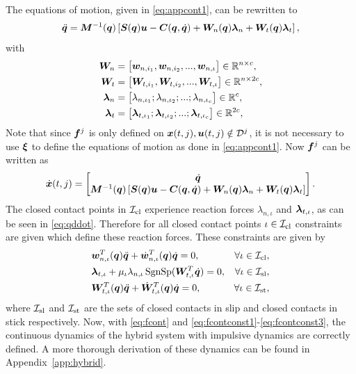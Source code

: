 \documentclass[../DC2017114Bouma.tex]{subfiles}
\begin{document}
The equations of motion, given in \eqref{eq:appcont1}, can be rewritten to
\begin{align}
\ddot{{\boldsymbol{q}}} = {\boldsymbol{M}}^{-1}({\boldsymbol{q}})\left[ {\boldsymbol{S}}({\boldsymbol{q}}){\boldsymbol{u}} - {\boldsymbol{C}}({\boldsymbol{q}},\dot{{\boldsymbol{q}}}) + {\boldsymbol{W}}_{n}({\boldsymbol{q}})\boldsymbol{\lambda}_{n} + {\boldsymbol{W}}_{t}({\boldsymbol{q}})\boldsymbol{\lambda}_{t}\right],\label{eq:qddot}
\end{align}
with
\begin{align}
{\boldsymbol{W}}_n &= \begin{bmatrix}
{\boldsymbol{w}}_{n,i_1},{\boldsymbol{w}}_{n,i_2},...,{\boldsymbol{w}}_{n,\iota}
\end{bmatrix}\in\mathbb{R}^{n\times c},\\
{\boldsymbol{W}}_t &= \begin{bmatrix}
{\boldsymbol{W}}_{t,i_1},{\boldsymbol{W}}_{t,i_2},...,{\boldsymbol{W}}_{t,\iota} 
\end{bmatrix}\in\mathbb{R}^{n\times 2c},\\
\boldsymbol{\lambda}_n &= \begin{bmatrix}
\lambda_{n,\iota_1};\lambda_{n,\iota_2};...;\lambda_{n,\iota_c} 
\end{bmatrix}\in\mathbb{R}^{c},\\
\boldsymbol{\lambda}_t &= \begin{bmatrix}
\boldsymbol{\lambda}_{t,\iota_1};\boldsymbol{\lambda}_{t,\iota_2};...;\boldsymbol{\lambda}_{t,\iota_c} 
\end{bmatrix}\in\mathbb{R}^{2c},
\end{align}
Note that since ${\boldsymbol{f}}^j$ is only defined on ${\boldsymbol{x}}(t,j),{\boldsymbol{u}}(t,j)\notin \mathcal{D}^j$, it is not necessary to use $\boldsymbol{\xi}$ to define the equations of motion as done in \eqref{eq:appcont1}. Now ${\boldsymbol{f}}^j$ can be written as
\begin{align}
\dot{{\boldsymbol{x}}}(t,j) =\begin{bmatrix}
\dot{{\boldsymbol{q}}}\\ {\boldsymbol{M}}^{-1}({\boldsymbol{q}})\left[ {\boldsymbol{S}}({\boldsymbol{q}}){\boldsymbol{u}} - {\boldsymbol{C}}({\boldsymbol{q}},\dot{{\boldsymbol{q}}}) + {\boldsymbol{W}}_{n}({\boldsymbol{q}})\boldsymbol{\lambda}_{n} + {\boldsymbol{W}}_{t}({\boldsymbol{q}})\boldsymbol{\lambda}_{t}\right]
\end{bmatrix}.\label{eq:fcont}
\end{align}
The closed contact points in $\mathcal{I}_{\text{cl}}$ experience reaction forces $\lambda_{n,\iota}$ and $\boldsymbol{\lambda}_{t,\iota}$, as can be seen in \eqref{eq:qddot}. Therefore for all closed contact points $\iota\in\mathcal{I}_{\text{cl}}$ constraints are given which define these reaction forces. These constraints are given by
\begin{align}
&{\boldsymbol{w}}^T_{n,\iota}({\boldsymbol{q}})\ddot{{\boldsymbol{q}}} + \dot{{\boldsymbol{w}}}^T_{n,\iota}({\boldsymbol{q}})\dot{{\boldsymbol{q}}} = 0, &\forall \iota\in\mathcal{I}_{\text{cl}},\label{eq:fcontconst1}\\
&\boldsymbol{\lambda}_{t,\iota} + \mu_{\iota}\lambda_{n,\iota}\operatorname{\text{SgnSp}}({\boldsymbol{W}}_{t,\iota}^T\dot{{\boldsymbol{q}}}) = 0, &\forall \iota\in\mathcal{I}_{\text{sl}},\label{eq:fcontconst2}\\
&{\boldsymbol{W}}^T_{t,\iota}({\boldsymbol{q}})\ddot{{\boldsymbol{q}}} + \dot{{\boldsymbol{W}}}^T_{t,\iota}({\boldsymbol{q}})\dot{{\boldsymbol{q}}} = 0, &\forall \iota\in\mathcal{I}_{\text{st}},\label{eq:fcontconst3}
\end{align}
where $\mathcal{I}_{\text{sl}}$ and $\mathcal{I}_{\text{st}}$ are the sets of closed contacts in slip and closed contacts in stick respectively. Now, with \eqref{eq:fcont} and \eqref{eq:fcontconst1}-\eqref{eq:fcontconst3}, the continuous dynamics of the hybrid system with impulsive dynamics are correctly defined. A more thorough derivation of these dynamics can be found in Appendix~\ref{app:hybrid}.
\end{document}
